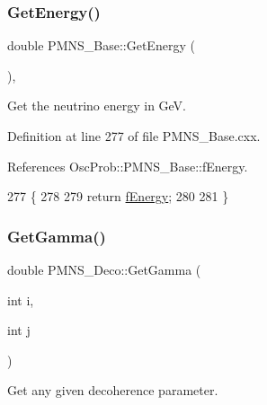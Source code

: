 \mbox{\label{classOscProb_1_1PMNS__Base_acc0d46cc4b8f911b40b807225003bbed}} 
\subsubsection{\texorpdfstring{Get\+Energy()}{GetEnergy()}}
{\footnotesize\ttfamily double P\+M\+N\+S\+\_\+\+Base\+::\+Get\+Energy (\begin{DoxyParamCaption}{ }\end{DoxyParamCaption})\hspace{0.3cm}{\ttfamily [virtual]}, {\ttfamily [inherited]}}

Get the neutrino energy in GeV. 

Definition at line 277 of file P\+M\+N\+S\+\_\+\+Base.\+cxx.



References Osc\+Prob\+::\+P\+M\+N\+S\+\_\+\+Base\+::f\+Energy.


\begin{DoxyCode}
277                             \{
278 
279   \textcolor{keywordflow}{return} \hyperlink{classOscProb_1_1PMNS__Base_a2800af6d436972f3e900867790c046b0}{fEnergy};
280 
281 \}
\end{DoxyCode}
\mbox{\label{classOscProb_1_1PMNS__Deco_a73461e806063588a8e3a9d5d0dd201cb}} 
\subsubsection{\texorpdfstring{Get\+Gamma()}{GetGamma()}}
{\footnotesize\ttfamily double P\+M\+N\+S\+\_\+\+Deco\+::\+Get\+Gamma (\begin{DoxyParamCaption}\item[{int}]{i,  }\item[{int}]{j }\end{DoxyParamCaption})\hspace{0.3cm}{\ttfamily [virtual]}}

Get any given decoherence parameter.

